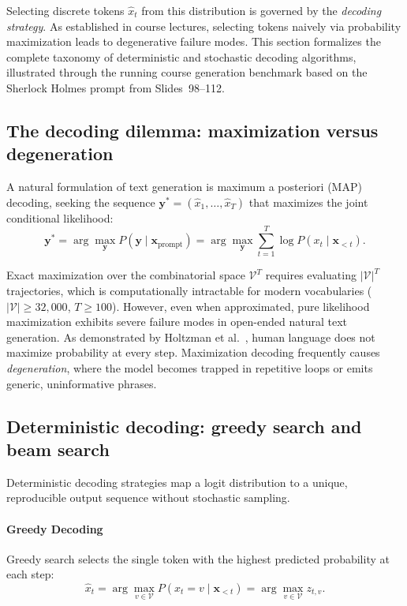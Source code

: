 \documentclass[../../main.tex]{subfiles}
\begin{document}
Selecting discrete tokens $\hat{x}_t$ from this distribution is governed by the \emph{decoding strategy}. As established in course lectures, selecting tokens naively via probability maximization leads to degenerative failure modes. This section formalizes the complete taxonomy of deterministic and stochastic decoding algorithms, illustrated through the running course generation benchmark based on the Sherlock Holmes prompt from Slides~98--112.


\subsection{The decoding dilemma: maximization versus degeneration}
\label{subsec:decoding_dilemma}

A natural formulation of text generation is maximum a posteriori (MAP) decoding, seeking the sequence $\mathbf{y}^* = (\hat{x}_1, \dots, \hat{x}_T)$ that maximizes the joint conditional likelihood:
\begin{equation}
\mathbf{y}^* = \arg\max_{\mathbf{y}} P(\mathbf{y} \mid \mathbf{x}_{\text{prompt}}) = \arg\max_{\mathbf{y}} \sum_{t=1}^T \log P(x_t \mid \mathbf{x}_{<t}).
\label{eq:map_decoding_objective}
\end{equation}

Exact maximization over the combinatorial space $\mathcal{V}^T$ requires evaluating $|\mathcal{V}|^T$ trajectories, which is computationally intractable for modern vocabularies ($|\mathcal{V}| \ge 32,000$, $T \ge 100$). However, even when approximated, pure likelihood maximization exhibits severe failure modes in open-ended natural text generation. As demonstrated by Holtzman et al.~\cite{holtzman2020}, human language does not maximize probability at every step. Maximization decoding frequently causes \emph{degeneration}, where the model becomes trapped in repetitive loops or emits generic, uninformative phrases.


\subsection{Deterministic decoding: greedy search and beam search}
\label{subsec:deterministic_decoding}

Deterministic decoding strategies map a logit distribution to a unique, reproducible output sequence without stochastic sampling.

\paragraph{Greedy Decoding}
Greedy search selects the single token with the highest predicted probability at each step:
\begin{equation}
\hat{x}_t = \arg\max_{v \in \mathcal{V}} P(x_t = v \mid \mathbf{x}_{<t}) = \arg\max_{v \in \mathcal{V}} z_{t,v}.
\label{eq:greedy_selection}
\end{equation}
\end{document}
